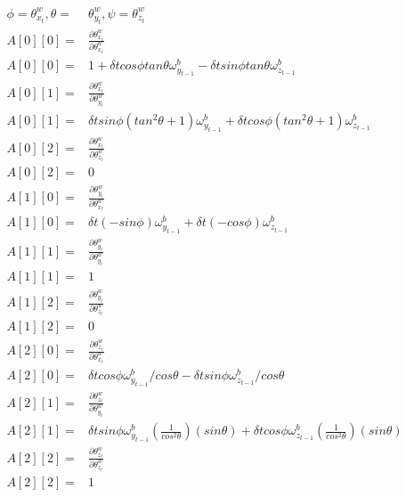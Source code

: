 \documentclass[conference]{IEEEtran}
\begin{document}
\begin{align*}
\phi =  \theta_{x_{t}}^{w}, \theta =&  \theta_{y_{t}}^{w}, \psi =  \theta_{z_{t}}^{w}\\
A[0][0] =& \frac{\partial \theta_{x_{t}}^{w}}{\partial \theta_{x_{t}}^{w}}\\
A[0][0] =& 1 + \delta t cos\phi tan\theta \omega_{y_{t-1}}^b - \delta t sin\phi tan\theta  \omega_{z_{t-1}}^b \\
A[0][1] =& \frac{\partial \theta_{x_{t}}^{w}}{\partial \theta_{y_{t}}^{w}}\\
A[0][1] =& \delta t sin\phi (tan^2\theta + 1) \omega_{y_{t-1}}^b + \delta t cos\phi (tan^2\theta + 1)  \omega_{z_{t-1}}^b \\
A[0][2] =& \frac{\partial \theta_{x_{t}}^{w}}{\partial \theta_{z_{t}}^{w}}\\
A[0][2] =& 0 \\
A[1][0] =& \frac{\partial \theta_{y_{t}}^{w}}{\partial \theta_{x_{t}}^{w}}\\
A[1][0] =& \delta t (-sin\phi) \omega_{y_{t-1}}^b + \delta t (-cos\phi) \omega_{z_{t-1}}^b  \\
A[1][1] =& \frac{\partial \theta_{y_{t}}^{w}}{\partial \theta_{y_{t}}^{w}}\\
A[1][1] =& 1  \\
A[1][2] =& \frac{\partial \theta_{y_{t}}^{w}}{\partial \theta_{z_{t}}^{w}}\\
A[1][2] =& 0\\
A[2][0] =& \frac{\partial \theta_{z_{t}}^{w}}{\partial \theta_{x_{t}}^{w}}\\
A[2][0] =&  \delta t cos\phi \omega_{y_{t-1}}^b / cos \theta -  \delta t sin\phi \omega_{z_{t-1}}^b / cos\theta \\
A[2][1] =& \frac{\partial \theta_{z_{t}}^{w}}{\partial \theta_{y_{t}}^{w}}\\
A[2][1] =&  \delta t sin\phi \omega_{y_{t-1}}^b (\frac{1}{cos^2 \theta})(sin\theta)  + \delta t cos\phi \omega_{z_{t-1}}^b (\frac{1}{cos^2 \theta})(sin\theta) \\
A[2][2] =& \frac{\partial \theta_{z_{t}}^{w}}{\partial \theta_{z_{t}}^{w}}\\
A[2][2] =& 1 \\
\end{align*}
\end{document}
